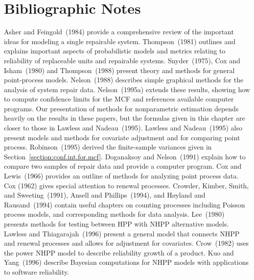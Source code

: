 \section*{Bibliographic Notes}
Asher and Feingold~(1984) provide a comprehensive review of the
important ideas for modeling a single repairable
system. Thompson~(1981) outlines and explains important aspects of
probabilistic models and metrics relating to reliability of
replaceable units and repairable systems. Snyder~(1975), Cox and
Isham~(1980) and Thompson~(1988) present theory and methods for
general point-process models.  Nelson~(1988) describes simple
graphical methods for the analysis of system repair data.
Nelson~(1995a) extends these results, showing how to compute
confidence limits for the MCF and references available computer
programs.  Our presentation of methods for nonparametric estimation
depends heavily on the results in these papers, but the formulas
given in this chapter are closer to those in Lawless and
Nadeau~(1995).  Lawless and Nadeau~(1995) also present models and
methods for covariate adjustment and for comparing point process.
Robinson~(1995) derived the finite-sample variances given in
Section~\ref{section:conf.int.for.mcf}.  Doganaksoy and
Nelson~(1991) explain how to compare two samples of repair data and
provide a computer program.  Cox and Lewis~(1966) provides an
outline of methods for analyzing point process data. Cox (1962)
gives special attention to renewal processes. Crowder, Kimber,
Smith, and Sweeting~(1991), Ansell and Phillips~(1994), and H\o yland
and Rausand~(1994) contain useful chapters on counting processes
including Poisson process models, and corresponding methods for data
analysis.  Lee~(1980) presents methods for testing between HPP with
NHPP alternative models.  Lawless and Thiagarajah~(1996) present a
general model that connects NHPP and renewal processes and allows
for adjustment for covariates.  Crow~(1982) uses the power NHPP
model to describe reliability growth of a product. Kuo and
Yang~(1996) describe Bayesian computations for NHPP models with
applications to software reliability.

